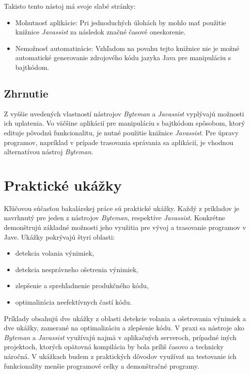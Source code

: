 \documentclass[11pt,final,oneside]{fithesis}
\begin{document}
Takisto tento nástoj má svoje slabé stránky:

\begin{itemize}
\item Mohutnosť aplikácie: Pri jednoduchých úlohách by mohlo mať použitie 
knižnice \textit{Javassist} za následok značné časové oneskorenie.
\item Nemožnosť automatizácie: Vzhľadom na povahu tejto knižnice nie je možné 
automatické generovanie zdrojového kódu jazyka Java pre manipuláciu s 
bajtkódom.
\end{itemize}

\section{Zhrnutie}
Z vyššie uvedených vlastností nástrojov \textit{Byteman} a \textit{Javassist} 
vyplývajú možnosti ich uplatenia. Vo väčšine aplikácií pre manipuláciu s 
bajtkódom spôsobom, ktorý edituje pôvodnú funkcionalitu, je nutné použitie 
knižnice \textit{Javassist}. Pre úpravy programov, napríklad v prípade 
trasovania správania sa aplikácií, je vhodnou alternatívou nástroj 
\textit{Byteman}.

\chapter{Praktické ukážky}

Kľúčovou súčasťou bakalárskej práce sú praktické ukážky. Každý z príkladov je 
navrhnutý pre jeden z nástrojov \textit{Byteman}, respektíve 
\textit{Javassist}. Konkrétne demonštrujú základné možnosti jeho využitia pre 
vývoj a trasovanie programov v Jave. Ukážky pokrývajú štyri oblasti:

\begin{itemize}
\item detekcia volania výnimiek, 
\item detekcia nesprávneho ošetrenia výnimiek,
\item zlepšenie a sprehľadnenie produkčného kódu,
\item optimalizácia neefektívnych častí kódu.
\end{itemize}

Príklady obsahujú dve ukážky z oblasti detekcie volania a ošetrovania výnimiek 
a dve ukážky, zamerané na optimalizáciu a zlepšenie kódu. V praxi sa nástroje 
ako \textit{Byteman} a \textit{Javassist} využívajú najmä v aplikačných 
serveroch, prípadné iných projektoch, ktorých opätovná kompilácia by bola 
príliš časovo a technicky náročná. V ukážkach budem z praktických dôvodov 
využívať na testovanie ich funkcionality menšie programové celky a demonštračné
programy.
\end{document}
